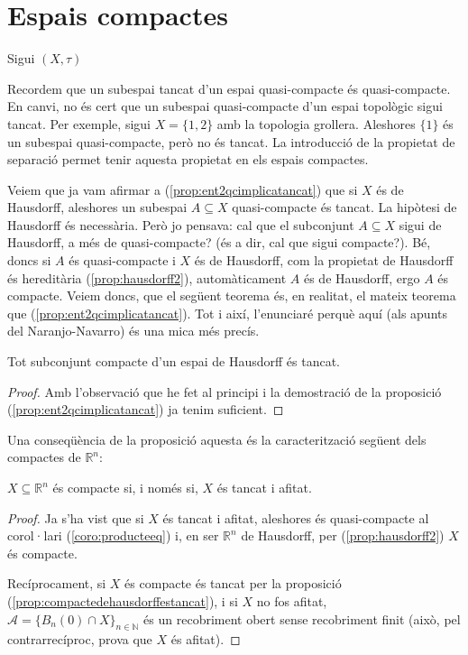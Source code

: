 \documentclass[../main.tex]{subfiles}
\begin{document}
\section{Espais compactes}

\begin{defi}
\label{def:espaiscompactes} Sigui $(X,\tau)$
\end{defi}

Recordem que un subespai tancat d'un espai quasi-compacte és quasi-compacte. En canvi, no és cert que un subespai quasi-compacte d'un espai topològic sigui tancat. Per exemple, sigui $X = \{1,2\}$ amb la topologia grollera. Aleshores $\{1\}$ és un subespai quasi-compacte, però no és tancat. La introducció de la propietat de separació permet tenir aquesta propietat en els espais compactes.

Veiem que ja vam afirmar a (\ref{prop:ent2qcimplicatancat}) que si $X$ és de Hausdorff, aleshores un subespai $A\subseteq X$ quasi-compacte és tancat. La hipòtesi de Hausdorff és necessària. Però jo pensava: cal que el subconjunt $A\subseteq X$ sigui de Hausdorff, a més de quasi-compacte? (és a dir, cal que sigui compacte?). Bé, doncs si $A$ és quasi-compacte i $X$ és de Hausdorff, com la propietat de Hausdorff és hereditària (\ref{prop:hausdorff2}), automàticament $A$ és de Hausdorff, ergo $A$ és compacte. Veiem doncs, que el següent teorema és, en realitat, el mateix teorema que (\ref{prop:ent2qcimplicatancat}). Tot i així, l'enunciaré perquè aquí (als apunts del Naranjo-Navarro) és una mica més precís.

\begin{prop}
\label{prop:compactedehausdorffestancat} Tot subconjunt compacte d'un espai de Hausdorff és tancat.
\end{prop}
\begin{proof}
 Amb l'observació que he fet al principi i la demostració de la proposició (\ref{prop:ent2qcimplicatancat}) ja tenim suficient.
\end{proof}

Una conseqüència de la proposició aquesta és la caracterització següent dels compactes de $\mathbb{R}^n$:

\begin{coro}
\label{coro:compactesiiacotatitancat} $X\subseteq\mathbb{R}^n$ és compacte si, i només si, $X$ és tancat i afitat.
\end{coro}
\begin{proof}
 Ja s'ha vist que si $X$ és tancat i afitat, aleshores és quasi-compacte al corol·lari (\ref{coro:producteeq}) i, en ser $\mathbb{R}^n$ de Hausdorff, per (\ref{prop:hausdorff2}) $X$ és compacte.
 
 Recíprocament, si $X$ és compacte és tancat per la proposició (\ref{prop:compactedehausdorffestancat}), i si $X$ no fos afitat, $\mathcal{A} = \{B_n(0)\cap X\}_{n\in\mathbb{N}}$ és un recobriment obert sense recobriment finit (això, pel contrarrecíproc, prova que $X$ és afitat).
\end{proof}
\end{document}
